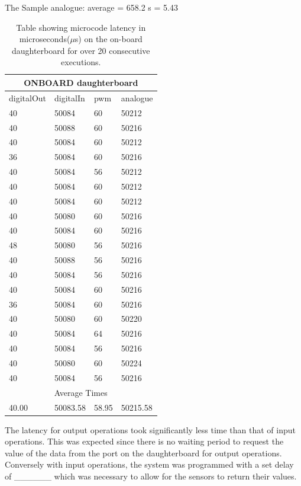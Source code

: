 The Sample analogue:%
average = 658.2
s = 5.43
\begin{table}[h!]
	\caption{Table showing microcode latency in microseconds($\mu$s) on the on-board daughterboard for over 20 consecutive executions.}\label{table:onboard}
	\begin{tabular}{|l|l|l|l|}
	\toprule
 \multicolumn{4}{c}{\textbf{ONBOARD daughterboard}} \\\hline

digitalOut & digitalIn & pwm & analogue \\\hline
40 & 50084 & 60 & 50212\\\hline
40 & 50088 & 60 & 50216 \\\hline
40 & 50084 & 60 & 50212 \\\hline
36 & 50084 & 60 & 50216 \\\hline
40 & 50084 & 56 & 50212 \\\hline
40 & 50084 & 60 & 50212 \\\hline
40 & 50084 & 60 & 50212 \\\hline
40 & 50080 & 60 & 50216 \\\hline
40 & 50084 & 60 & 50216 \\\hline
48 & 50080 & 56 & 50216 \\\hline
40 & 50088 & 56 & 50216 \\\hline
40 & 50084 & 56 & 50216 \\\hline
40 & 50084 & 60 & 50216 \\\hline
36 & 50084 & 60 & 50216 \\\hline
40 & 50080 & 60 & 50220 \\\hline
40 & 50084 & 64 & 50216 \\\hline
40 & 50084 & 56 & 50216 \\\hline
40 & 50080 & 60 & 50224 \\\hline
40 & 50084 & 56 & 50216 \\\hline
\multicolumn{4}{c}{Average Times} \\\hline
40.00 & 50083.58 & 58.95 & 50215.58

\end{tabular}
\end{table}

The latency for output operations took significantly less time than that of input operations. This was expected since there is no waiting period to request the value of the data from the port on the daughterboard for output operations. Conversely with input operations, the system was programmed with a set delay of \_\_\_\_\_\_ which was necessary to allow for the sensors to return their values.

